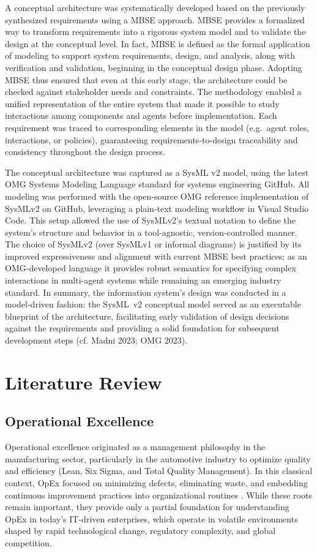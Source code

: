 A conceptual architecture was systematically developed based on the previously synthesized requirements using a MBSE approach. MBSE provides a formalized way to transform requirements into a rigorous system model and to validate the design at the conceptual level. In fact, MBSE is defined as the formal application of modeling to support system requirements, design, and analysis, along with verification and validation, beginning in the conceptual design phase. Adopting MBSE thus ensured that even at this early stage, the architecture could be checked against stakeholder needs and constraints. The methodology enabled a unified representation of the entire system that made it possible to study interactions among components and agents before implementation. Each requirement was traced to corresponding elements in the model (e.g.~agent roles, interactions, or policies), guaranteeing requirements-to-design traceability and consistency throughout the design process.

The conceptual architecture was captured as a SysML v2 model, using the latest OMG Systems Modeling Language standard for systems engineering GitHub. All modeling was performed with the open-source OMG reference implementation of SysMLv2 on GitHub, leveraging a plain-text modeling workflow in Visual Studio Code. This setup allowed the use of SysMLv2's textual notation to define the system's structure and behavior in a tool-agnostic, version-controlled manner. The choice of SysMLv2 (over SysMLv1 or informal diagrams) is justified by its improved expressiveness and alignment with current MBSE best practices; as an OMG-developed language it provides robust semantics for specifying complex interactions in multi-agent systems while remaining an emerging industry standard. In summary, the information system's design was conducted in a model-driven fashion: the SysML~v2 conceptual model served as an executable blueprint of the architecture, facilitating early validation of design decisions against the requirements and providing a solid foundation for subsequent development steps (cf. Madni 2023; OMG 2023).

\section{Literature Review}\label{sec:lit-rev}

\subsection{Operational Excellence}\label{subsec:op-ex}
Operational excellence originated as a management philosophy in the manufacturing sector, particularly in the automotive industry to optimize quality and efficiency (Lean, Six Sigma, and Total Quality Management). In this classical context, OpEx focused on minimizing defects, eliminating waste, and embedding continuous improvement practices into organizational routines \parencite{juranQuality1999, womackLean2013}. While these roots remain important, they provide only a partial foundation for understanding OpEx in today's IT-driven enterprises, which operate in volatile environments shaped by rapid technological change, regulatory complexity, and global competition.

